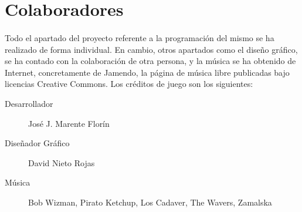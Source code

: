 \section{Colaboradores}

\paragraph{}
Todo el apartado del proyecto referente a la programación del mismo se ha realizado de forma individual. En cambio, otros apartados
como el diseño gráfico, se ha contado con la colaboración de otra persona, y la música se ha obtenido de Internet, concretamente 
de Jamendo, la página de música libre publicadas bajo licencias Creative Commons. Los créditos de juego son los siguientes:

\begin{description}
    \item [Desarrollador] José J. Marente Florín
    \item [Diseñador Gráfico] David Nieto Rojas
    \item [Música] Bob Wizman, Pirato Ketchup, Los Cadaver, The Wavers, Zamalska 
\end{description}
